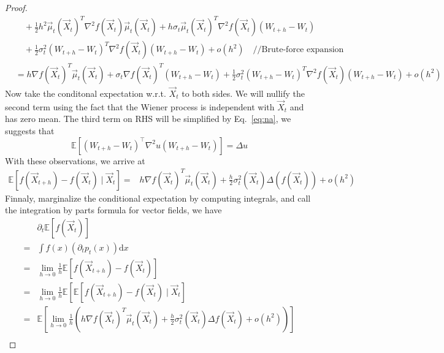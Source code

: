 \documentclass{article}
\begin{document}
\begin{proof}
\begin{equation}
\begin{aligned}
& \quad+\frac{1}{2} h^2 {\vec{\mu}_t}\left(\vec{X}_t\right)^T \nabla^2 f\left(\vec{X}_t\right) {\vec{\mu}_t}\left(\vec{X}_t\right)+h \sigma_t {\vec{\mu}_t}\left(\vec{X}_t\right)^T \nabla^2 f\left(\vec{X}_t\right)\left(W_{t+h}-W_t\right)
\\&\quad +\frac{1}{2} \sigma_t^2\left(W_{t+h}-W_t\right)^T \nabla^2 f\left(\vec{X}_t\right)\left(W_{t+h}-W_t\right)+o(h^2) \quad //\text{Brute-force expansion}
\\&=
h \nabla f\left(\vec{X}_t\right)^T {\vec{\mu}_t}\left(\vec{X}_t\right)+\sigma_t \nabla f\left(\vec{X}_t\right)^T\left(W_{t+h}-W_t\right)
+
\frac{1}{2} \sigma_t^2\left(W_{t+h}-W_t\right)^T \nabla^2 f\left(\vec{X}_t\right)\left(W_{t+h}-W_t\right)+o(h^2)
\end{aligned}
\end{equation}
Now take the conditonal expectation w.r.t. $\vec{X}_t$ to both sides. 
We will nullify the second term using the fact that the Wiener process is independent with $\vec{X}_t$ and has zero mean. The third term on RHS will be simplified by Eq.~\eqref{eq:na}, we suggests that
$$
\mathbb{E}\left[(W_{t+h}-W_t)^\top \nabla^2 u (W_{t+h}-W_t)\right]
= \Delta u
$$
With these observations, we arrive at
\begin{equation}
    \begin{aligned}
\mathbb{E}\left[f\left(\vec{X}_{t+h}\right)-f\left(\vec{X}_t\right) \mid \vec{X}_t\right] 
=&  h \nabla f\left(\vec{X}_t\right)^T {\vec{\mu}_t}\left(\vec{X}_t\right)
+\frac{h}{2} \sigma_t^2(\vec{X}_t) \Delta \left(f(\vec{X}_t)\right)
+ o(h^2)
\end{aligned}
\end{equation}
Finnaly, marginalize the conditional expectation by computing integrals, and call the integration by parts formula for vector fields, we have 
$$
\begin{aligned}
& \partial_t \mathbb{E}\left[f\left(\vec{X}_t\right)\right] 
\\= & \int f(x) \left(\partial_t p_t(x)\right) \mathrm{d}x
\\= & \lim _{h \rightarrow 0} \frac{1}{h} \mathbb{E}\left[f\left(\vec{X}_{t+h}\right)-f\left(\vec{X}_t\right)\right] \\
= & \lim _{h \rightarrow 0} \frac{1}{h} \mathbb{E}\left[\mathbb{E}\left[f\left(\vec{X}_{t+h}\right)-f\left(\vec{X}_t\right) \mid \vec{X}_t\right]\right. \\
= & \mathbb{E}\left[\lim _{h \rightarrow 0} \frac{1}{h}\left(h \nabla f\left(\vec{X}_t\right)^T {\vec{\mu}_t}\left(\vec{X}_t\right)+\frac{h}{2} \sigma_t^2 (\vec{X}_t)\Delta f\left(\vec{X}_t\right)+o(h^2)\right)\right] \\ 

\end{aligned}$$
\end{proof}
\end{document}
